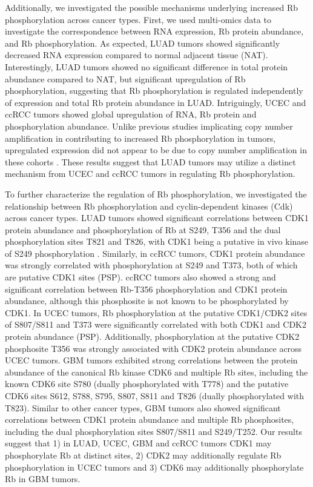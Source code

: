 Additionally, we investigated the possible mechanisms underlying increased Rb phosphorylation across cancer types. First, we used multi-omics data to investigate the correspondence between  RNA expression, Rb protein abundance, and Rb phosphorylation. As expected, LUAD tumors showed significantly decreased  RNA expression compared to normal adjacent tissue (NAT). Interestingly, LUAD tumors showed no significant difference in total protein abundance compared to NAT, but significant upregulation of Rb phosphorylation, suggesting that Rb phosphorylation is regulated independently of  expression and total Rb protein abundance in LUAD. Intriguingly, UCEC and ccRCC tumors showed global upregulation of  RNA, Rb protein and phosphorylation abundance. Unlike previous studies implicating  copy number amplification in contributing to increased Rb phosphorylation in tumors, upregulated  expression did not appear to be due to copy number amplification in these cohorts \cite{vasaikars_cptac:ProteogenomicAnalysis2019}. These results suggest that LUAD tumors may utilize a distinct mechanism from UCEC and ccRCC tumors in regulating Rb phosphorylation.

To further characterize the regulation of Rb phosphorylation, we investigated the relationship between Rb phosphorylation and cyclin-dependent kinases (Cdk) across cancer types. LUAD tumors showed significant correlations between CDK1 protein abundance and phosphorylation of Rb at S249, T356 and the dual phosphorylation sites T821 and T826, with CDK1 being a putative in vivo kinase of S249 phosphorylation \cite{hasslerm_mittnachts:CrystalStructure2007}. Similarly, in ccRCC tumors, CDK1 protein abundance was strongly correlated with phosphorylation at S249 and T373, both of which are putative CDK1 sites (PSP). ccRCC tumors also showed a strong and significant correlation between Rb-T356 phosphorylation and CDK1 protein abundance, although this phosphosite is not known to be phosphorylated by CDK1. In UCEC tumors, Rb phosphorylation at the putative CDK1/CDK2 sites of S807/S811 and T373 were significantly correlated with both CDK1 and CDK2 protein abundance (PSP). Additionally, phosphorylation at the putative CDK2 phosphosite T356 was strongly associated with CDK2 protein abundance across UCEC tumors. GBM tumors exhibited strong correlations between the protein abundance of the canonical Rb kinase CDK6 and multiple Rb sites, including the known CDK6 site S780 (dually phosphorylated with T778) and the putative CDK6 sites S612, S788, S795, S807, S811 and T826 (dually phosphorylated with T823).  Similar to other cancer types, GBM tumors also showed significant correlations between CDK1 protein abundance and multiple Rb phosphosites, including the dual phosphorylation sites S807/S811 and S249/T252. Our results suggest that 1) in LUAD, UCEC, GBM and ccRCC tumors CDK1 may phosphorylate Rb at distinct sites, 2) CDK2 may additionally regulate Rb phosphorylation in UCEC tumors and 3) CDK6 may additionally phosphorylate Rb in GBM tumors.

